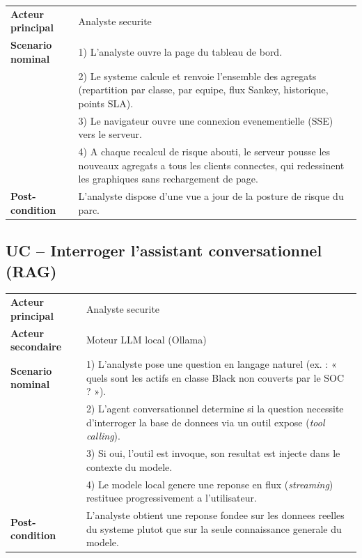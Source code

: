 \begin{longtable}{@{}p{3.2cm}p{9.6cm}@{}}
\toprule
\textbf{Acteur principal} & Analyste securite \\
\textbf{Scenario nominal} &
1) L'analyste ouvre la page du tableau de bord. \\
& 2) Le systeme calcule et renvoie l'ensemble des agregats (repartition par
classe, par equipe, flux Sankey, historique, points SLA). \\
& 3) Le navigateur ouvre une connexion evenementielle (SSE) vers le serveur. \\
& 4) A chaque recalcul de risque abouti, le serveur pousse les nouveaux agregats
a tous les clients connectes, qui redessinent les graphiques sans rechargement
de page. \\
\textbf{Post-condition} & L'analyste dispose d'une vue a jour de la posture de
risque du parc. \\
\bottomrule
\end{longtable}

\subsection{UC -- Interroger l'assistant conversationnel (RAG)}

\begin{longtable}{@{}p{3.2cm}p{9.6cm}@{}}
\toprule
\textbf{Acteur principal} & Analyste securite \\
\textbf{Acteur secondaire} & Moteur LLM local (Ollama) \\
\textbf{Scenario nominal} &
1) L'analyste pose une question en langage naturel (ex. : « quels sont les
actifs en classe Black non couverts par le SOC ? »). \\
& 2) L'agent conversationnel determine si la question necessite d'interroger la
base de donnees via un outil expose (\emph{tool calling}). \\
& 3) Si oui, l'outil est invoque, son resultat est injecte dans le contexte du
modele. \\
& 4) Le modele local genere une reponse en flux (\emph{streaming}) restituee
progressivement a l'utilisateur. \\
\textbf{Post-condition} & L'analyste obtient une reponse fondee sur les donnees
reelles du systeme plutot que sur la seule connaissance generale du modele. \\
\bottomrule
\end{longtable}
